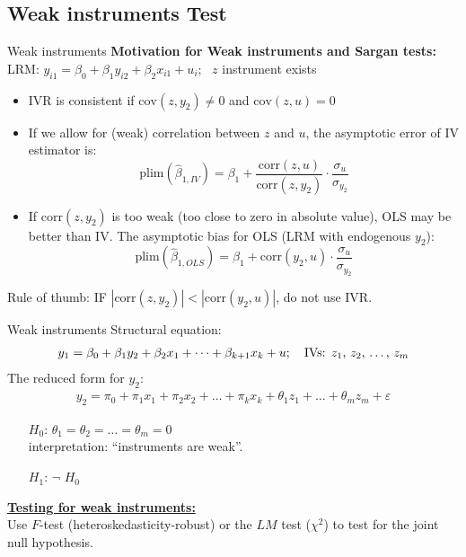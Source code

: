 \documentclass[usenames,dvipsnames]{beamer}
\begin{document}
\subsection{Weak instruments Test}
\begin{frame}{Weak instruments}
\textbf{Motivation for Weak instruments and Sargan tests:} \\
\medskip
LRM: \quad $y_{i1}=\beta_0+\beta_1 y_{i2}+\beta_2 x_{i1}+u_i$; \ $z$ instrument exists
\bigskip
\begin{itemize}
\item IVR is consistent if $\mathrm{cov}(z,y_2) \neq 0$ and $\mathrm{cov}(z, u) = 0$
\item If we allow for (weak) correlation between $z$ and $u$, the asymptotic error of IV estimator is:
\small $$\mathrm{plim}(\hat{\beta}_{1, IV}) = \beta_1 + \frac{\mathrm{corr}(z,u)}{\mathrm{corr}(z,y_2)} \cdot \frac{\sigma_u}{\sigma_{y_2}} $$
\item If $\mathrm{corr}(z, y_2)$ is too weak (too close to zero in absolute value), OLS may be better than IV. The asymptotic bias for OLS (LRM with endogenous $y_2$):
\small $$\mathrm{plim}(\hat{\beta}_{1,OLS})=\beta_1+\mathrm{corr}(y_2,u) \cdot \frac{\sigma_u}{\sigma_{y_2}}$$
\end{itemize}
Rule of thumb: IF $|\mathrm{corr}(z,y_2)| < |\mathrm{corr}(y_2,u)|$, do not use IVR.
\end{frame}
\begin{frame}{Weak instruments}
Structural equation: 
\begin{align*}
y_1=\beta_0+\beta_1 y_2 + \beta_2 x_1 + \dots + \beta_{k+1} x_k + u; \quad \text{IVs: $z_1$, $z_2$, \dots , $z_m$}
\end{align*}
The reduced form for $y_2$: 
\begin{align*}
y_2=\pi_0 + \pi_1 x_1 + \pi_2 x_2 + \dots + \pi_k x_k + \theta_1 z_1 + \dots + \theta_m z_m + \varepsilon
\end{align*}
\vspace{-0.3cm}
\begin{itemize}
\item[$H_0$:] $\theta_1=\theta_2=\dots=\theta_m=0$ \\interpretation: ``instruments are weak''.
\item[$H_1$:] $\neg$ $H_0$
\end{itemize}
\bigskip
\textbf{\underline{Testing for weak instruments:}} \\
\medskip
Use $F$-test (heteroskedasticity-robust) or the $LM$ test ($\chi^2$) to test for the joint null hypothesis.
\end{frame}
\end{document}
